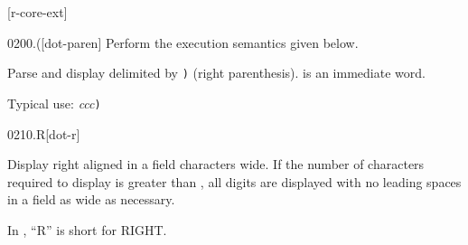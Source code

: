 
\ifanswerfiles

	[r-core-ext]
\fi

%
%
%


\begin{worddef}[.p]{0200}{.(}[dot-paren]
\compile
	Perform the execution semantics given below.

\execute

	Parse and display  delimited by \texttt{)} (right
	parenthesis).  is an immediate word.


	\begin{rationale} %
		Typical use:
			 \emph{ccc}\texttt{)}
	\end{rationale}
\end{worddef}

\vspace*{-2.5ex}\enlargethispage{8ex}
\begin{worddef}{0210}{.R}[dot-r]
\item {}

	Display  right aligned in a field 
	characters wide. If the number of characters required to display
	 is greater than , all digits are displayed
	with no leading spaces in a field as wide as necessary.

	\begin{rationale} %
		In , ``R'' is short for RIGHT.
	\end{rationale}
\end{worddef}

